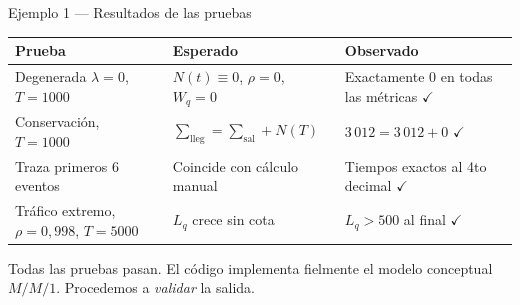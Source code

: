 \documentclass[aspectratio=1610, 10pt]{beamer}
\begin{document}
\begin{frame}{Ejemplo 1 — Resultados de las pruebas}
  \begin{center}\footnotesize
    \renewcommand{\arraystretch}{1.25}
    \begin{tabular}{lll}
      \toprule
      \textbf{Prueba} & \textbf{Esperado} & \textbf{Observado} \\
      \midrule
      Degenerada $\lambda=0$, $T=1000$
        & $N(t)\equiv 0$, $\rho=0$, $W_q=0$
        & Exactamente $0$ en todas las métricas $\checkmark$ \\
      Conservación, $T=1000$
        & $\sum_{\text{lleg}} = \sum_{\text{sal}} + N(T)$
        & $3\,012 = 3\,012 + 0$ $\checkmark$ \\
      Traza primeros 6 eventos
        & Coincide con cálculo manual
        & Tiempos exactos al 4to decimal $\checkmark$ \\
      Tráfico extremo, $\rho=0{,}998$, $T=5000$
        & $L_q$ crece sin cota
        & $L_q > 500$ al final $\checkmark$ \\
      \bottomrule
    \end{tabular}
  \end{center}

  \vspace{8pt}

  \vspace{2pt}
  \begin{resultadobox}
    \footnotesize
    Todas las pruebas pasan. El código implementa fielmente el modelo conceptual
    $M/M/1$. Procedemos a \emph{validar} la salida.
  \end{resultadobox}
\end{frame}
\end{document}
